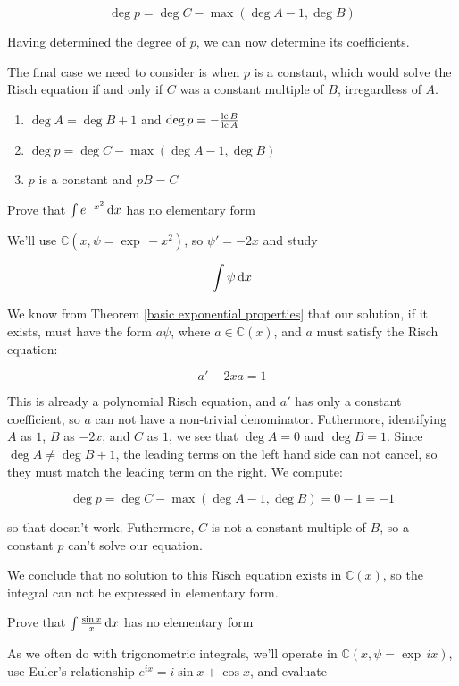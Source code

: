 $$\deg p = \deg C - \max(\deg A - 1, \deg B)$$

Having determined the degree of $p$, we can now determine its
coefficients.

The final case we need to consider is when $p$ is a constant, which
would solve the Risch equation if and only if $C$ was a constant
multiple of $B$, irregardless of $A$.

\begin{enumerate}
\item $\deg A = \deg B + 1$ and $\deg p =-\frac{{\rm lc\,} B}{{\rm lc\,} A} $
\item $\deg p = \deg C - \max(\deg A - 1, \deg B)$
\item $p$ is a constant and $pB = C$
\end{enumerate}

\vfill\eject

\example
\label{exp e^{-x^2}}
Prove that $\int e^{-x^2}\, {\rm d}x$ has no elementary form

We'll use ${\mathbb C}(x, \psi = \exp\, -x^2)$, so $\psi' = -2x$ and
study

$$\int \psi \, {\rm d}x$$

We know from Theorem \ref{basic exponential properties} that our
solution, if it exists, must have the form $a\psi$, where $a \in
{\mathbb C}(x)$, and $a$ must satisfy the Risch equation:

$$a' - 2x a = 1$$

This is already a polynomial Risch equation, and $a'$ has only
a constant coefficient, so $a$ can not have a non-trivial denominator.
Futhermore, identifying $A$ as $1$, $B$ as $-2x$, and $C$ as $1$,
we see that $\deg A = 0$ and $\deg B = 1$.  Since $\deg A \ne \deg B + 1$,
the leading terms on the left hand side can not cancel,
so they must match the leading term on the right.
We compute:

$$\deg p = \deg C - \max(\deg A - 1, \deg B) = 0 - 1 = -1$$

so that doesn't work.  Futhermore, $C$ is not a constant
multiple of $B$, so a constant $p$ can't solve our equation.

We conclude that no solution to this Risch equation exists in ${\mathbb C}(x)$,
so the integral can not be expressed in elementary form.

\endexample


\example Prove that $\int \frac{\sin x}{x} \, {\rm d}x$ has no elementary form

As we often do with trigonometric integrals, we'll operate in
${\mathbb C}(x, \psi = \exp \,ix)$, use Euler's relationship
$e^{ix}=i\sin x + \cos x$, and evaluate

